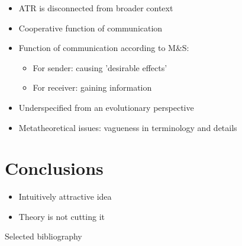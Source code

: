 \documentclass[xcolor=table]{beamer}       %
\begin{document}
\begin{frame}{\insertsection}
    \begin{itemize}
        \item ATR is disconnected from broader context
        \item Cooperative function of communication
        \item Function of communication according to M\&S:
            \begin{itemize}
                \item For sender: causing 'desirable effects'
                \item For receiver: gaining information
            \end{itemize}
        \item Underspecified from an evolutionary perspective
        \item Metatheoretical issues: vagueness in terminology and details
    \end{itemize}
\end{frame}

\section{Conclusions}

\begin{frame}{\insertsection}
    \begin{itemize}
        \item Intuitively attractive idea
        \item Theory is not cutting it
    \end{itemize}
\end{frame}

\begin{frame}{Selected bibliography}
    \nocite{MS11, Tomasello09, Sperber01, Sperber10}
    \printbibliography
\end{frame}
\end{document}
